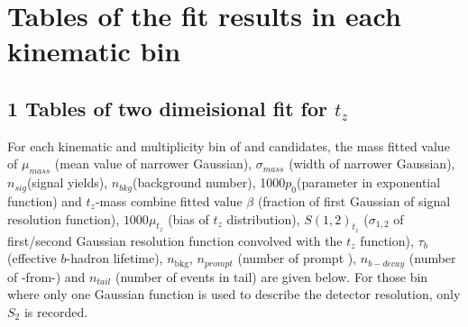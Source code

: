 \section{Tables of the fit results in each kinematic bin }
\label{sec:FitResult}
\subsection*{1 Tables of two dimeisional fit for $t_z$}
For each kinematic and multiplicity bin of \jpsi and \psitwos candidates, the mass fitted value of $\mu_{mass}$ (mean value of narrower Gaussian), $\sigma_{mass}$ (width of narrower Gaussian), $n_{sig}$(signal yields), $n_{bkg}$(background number), 1000$p_{0}$(parameter in exponential function) and $t_z$-mass combine fitted value $\beta$ (fraction of first Gaussian of signal resolution function),  $1000\mu_{t_z}$ (bias of $t_z$ distribution), $S(1,2)_{t_z}$ ($\sigma_{1,2}$ of first/second Gaussian resolution function convolved with the $t_z$ function), $\tau_b$(effective $b$-hadron lifetime), $n_\mathrm{bkg}$, $n_{prompt}$ (number of prompt \psitwos), $n_{b-decay}$ (number of \psitwos-from-\bquark) and $n_{tail}$ (number of events in tail) are given below. For those 
bin where only one Gaussian function is used to describe the detector resolution, only $S_2$ is recorded.
\clearpage






























\clearpage
